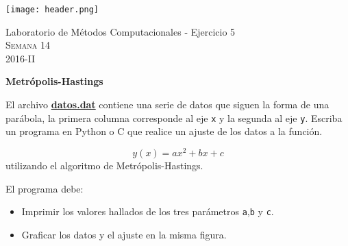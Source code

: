 \documentclass[11pt,letterpaper]{exam}
\begin{document}
\begin{center}

\texttt{[image: header.png]}

\vspace{1.0cm}
{\Large Laboratorio de M\'etodos Computacionales - Ejercicio 5} \\
\textsc{Semana 14}\\
2016-II\\
\end{center}



\vspace{0.5cm}

\noindent

\vspace{0.5cm}

\begin{questions}
 

\question \textbf{Metr\'opolis-Hastings}

El archivo \href{https://github.com/ComputoCienciasUniandes/MetodosComputacionales/blob/master/lab/16-2/ej5/datos.dat}{\textbf{datos.dat}} contiene una serie de datos que siguen la forma de una par\'abola, la primera columna corresponde al eje \verb'x' y la segunda al eje \verb'y'. Escriba un programa en Python o C que realice un ajuste de los datos a la funci\'on.

$$ y(x) = ax^2+bx+c $$
utilizando el algoritmo de Metr\'opolis-Hastings.

El programa debe:

\begin{itemize}
\item Imprimir los valores hallados de los tres par\'ametros \verb'a',\verb'b' y \verb'c'.
\item Graficar los datos y el ajuste en la misma figura.
\end{itemize}

\end{questions}
\end{document}
